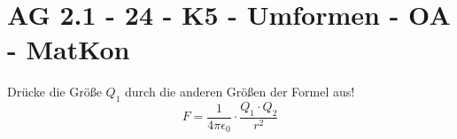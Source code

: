 \section{AG 2.1 - 24 - K5 - Umformen - OA - MatKon}

\begin{beispiel}[AG 2.1]{1}
Drücke die Größe $Q_1$ durch die anderen Größen der Formel aus!
$$F=\dfrac{1}{4\pi\epsilon_0}\cdot\dfrac{Q_1\cdot Q_2}{r^2}$$

\end{beispiel}